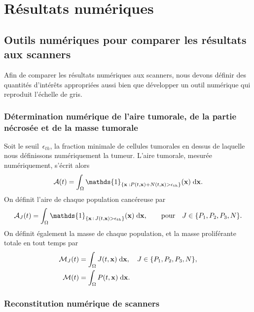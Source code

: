 \documentclass[main.tex]{subfiles}
\begin{document}
\section{Résultats numériques}\label{sec:NumRes}

\subsection{Outils numériques pour comparer les résultats aux scanners}

Afin de comparer les résultats numériques aux scanners, nous devons définir des quantités d'intérêts appropriées aussi bien que développer un outil numérique qui reproduit l'échelle de gris. 
\subsubsection{Détermination numérique de l'aire tumorale, de la partie nécrosée et de la masse tumorale}

Soit le seuil~$\epsilon_{th}$, la fraction minimale de cellules tumorales en dessus de laquelle nous définissons numériquement la tumeur. 
L'aire tumorale, mesurée numériquement, s'écrit alors
\begin{equation}
\label{eq:airetot}
\mathcal{A}(t)=\int_\Omega \mathds{1}_{\{\vecx\;: P(t,\vecx)+N(t,\vecx) >\epsilon_{th}\}}(\vecx)\textrm{\;d}\vecx.
\end{equation}
On définit l'aire de chaque population cancéreuse par
\begin{equation}
\mathcal{A}_J(t)=\int_\Omega
\mathds{1}_{\{\vecx\,:\,J(t,\vecx)>\epsilon_{th}\}}(\vecx)\textrm{\;d}\vecx,
\qquad \text{pour}\quad J \in \{P_1,P_2,P_3,N \}.
\label{eq:airepop}
\end{equation}
On définit également la masse de chaque population, et la masse proliférante totale en tout temps par 
\begin{align}
\mathcal{M}_J(t)&=\int_\Omega J(t,\mathbf{x}) \textrm{\;d}\mathbf{x}, \quad J \in \{P_1,P_2,P_3,N \},
\label{eq:masspop} \\
\mathcal{M}(t)&=\int_\Omega P 
(t,\mathbf{x})\textrm{\;d}\mathbf{x}.
\label{eq:masstot}
\end{align}


\subsubsection{Reconstitution numérique de scanners}
\end{document}
